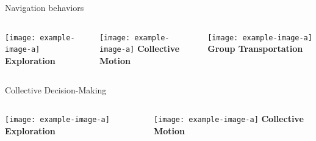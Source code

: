 \documentclass[presentation, 9pt]{beamer}\mode<presentation>{\usetheme{AMSBolognaFC}}
\begin{document}
\begin{frame}{Navigation behaviors}
\begin{center}
	\begin{columns}
		\begin{column}{0.32\textwidth}
			\texttt{[image: example-image-a]}
			\centering
			\Large{\textbf{Exploration}}
		\end{column}
		\begin{column}{0.32\textwidth}
			\texttt{[image: example-image-a]}
			\centering
			\Large{\textbf{Collective Motion}}
		\end{column}
		\begin{column}{0.32\textwidth}
			\texttt{[image: example-image-a]}
			\centering
			\Large{\textbf{Group Transportation}}
		\end{column}
	\end{columns}
\end{center}
\end{frame}
\begin{frame}{Collective Decision-Making}
	\begin{columns}
		\begin{column}{0.32\textwidth}
			\texttt{[image: example-image-a]}
			\centering
			\Large{\textbf{Exploration}}
		\end{column}
		\begin{column}{0.32\textwidth}
			\texttt{[image: example-image-a]}
			\centering
			\Large{\textbf{Collective Motion}}
		\end{column}
	\end{columns}
\end{frame}
\end{document}
